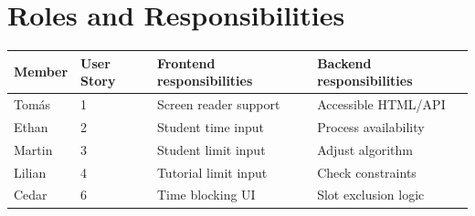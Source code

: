 \section{Roles and Responsibilities}


\vspace{0.2cm}

\begin{center}
\begin{tabular}{|l|l|l|l|}
\hline
\textbf{Member} & \textbf{User Story} & \textbf{Frontend responsibilities} & \textbf{Backend responsibilities} \\
\hline
Tomás & 1 & Screen reader support & Accessible HTML/API \\
\hline
Ethan & 2 & Student time input & Process availability \\
\hline
Martin & 3 & Student limit input & Adjust algorithm \\
\hline
Lilian & 4 & Tutorial limit input & Check constraints \\
\hline
Cedar & 6 & Time blocking UI & Slot exclusion logic \\
\hline
\end{tabular}
\end{center}
